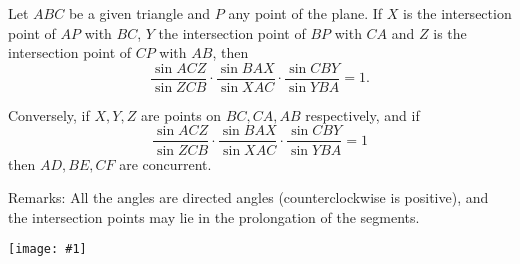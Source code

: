\documentclass[12pt]{article}
\newcommand{\figuraex}[2]{\begin{center}\texttt{[image: \#1]}\end{center}}
\begin{document}
Let $ABC$ be a given triangle and $P$ any point of the plane. If $X$ is the intersection point of $AP$ with $BC$, $Y$ the intersection point of $BP$ with $CA$ and $Z$ is the intersection point of $CP$ with $AB$, then
$$\frac{\sin ACZ}{\sin ZCB}\cdot\frac{\sin BAX}{\sin XAC}\cdot\frac{\sin CBY}{\sin YBA}=1.$$

Conversely, if $X,Y,Z$ are points on $BC,CA,AB$ respectively, and if 
\[
\frac{\sin ACZ}{\sin ZCB}\cdot\frac{\sin BAX}{\sin XAC}\cdot\frac{\sin CBY}{\sin YBA}=1
\]
then $AD,BE,CF$ are concurrent.

Remarks: All the angles are directed angles (counterclockwise is positive), and the intersection points may lie in the prolongation of the segments.
\figuraex{ceva}{scale=0.75}
\end{document}
